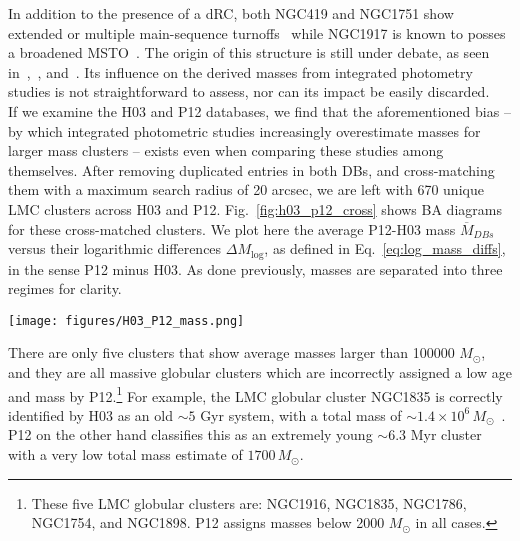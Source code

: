 \documentclass[draft]{aa}
\begin{document}
In addition to the presence of a dRC, both NGC419 and NGC1751 show
extended or multiple main-sequence turnoffs~\citep[MSTO; see:][]
{Glatt_2008,Milone_2009,Rubele_2010,Rubele_2011,Girardi_2011}
while NGC1917 is known to posses a broadened MSTO~\citep{Milone_2009}.
The origin of this structure is still under debate, as seen in~\cite
{Piatti_Bastian_2016},~\cite{Milone_2016}, and~\cite{Li_2016}.
Its influence on the derived masses from integrated photometry studies is not
straightforward to assess, nor can its impact be easily discarded.\\

If we examine the H03 and P12 databases, we find that the aforementioned bias
-- by which integrated photometric studies increasingly overestimate masses for
larger mass clusters -- exists even when comparing these studies among
themselves.
%
After removing duplicated entries in both DBs, and cross-matching them with
a maximum search radius of 20 arcsec, we are left with 670 unique LMC clusters
across H03 and P12.
Fig.~\ref{fig:h03_p12_cross} shows BA diagrams for these cross-matched clusters.
We plot here the average P12-H03 mass $\overline{M}_{DBs}$
versus their logarithmic differences $\Delta M_{\log}$, as defined in
Eq.~\ref{eq:log_mass_diffs}, in the sense P12 minus H03. As done previously,
masses are separated into three regimes for clarity.
%
\begin{figure*}
\texttt{[image: figures/H03\_P12\_mass.png]}
\caption{\emph{Left}: BA plot for the logarithmic mass differences between P12
and H03 masses, for average mass values below 1000 $M_{\odot}$. Clusters are
colored according to the difference in their assigned logarithmic ages by each
DB -- i.e.: $\Delta \log(age/yr)$ -- in the sense P12 minus H03; see colorbar in
the right plot. The mean and standard deviation $\Delta M_{\log}$ are shown as a
dashed black line and a gray region, respectively.
\emph{Center}: idem, for average DB masses $1000<\overline{M}_{DB}<10000\,(M_
{\odot})$.
\emph{Right}: idem, for average DB masses $\overline{M}_{DB}>10000\,(M_
{\odot})$.}
\label{fig:h03_p12_cross}
\end{figure*}
%
There are only five clusters that show average masses larger than 100000
$M_{\odot}$, and they are all massive globular clusters which are incorrectly
assigned a low age and mass by P12.\footnote{These five LMC globular clusters
are: NGC1916, NGC1835, NGC1786, NGC1754, and NGC1898. P12 assigns masses
below 2000 $M_{\odot}$ in all cases.}
For example, the LMC globular cluster NGC1835 is correctly identified by H03 as
an old ${\sim}5$ Gyr system, with a total mass of
$\sim1.4{\times}10^6\,M_{\odot}$~\citep[a reasonable value, although a bit
overestimated, according to][]{Dubath_1990}. P12 on the other hand classifies
this as an extremely young ${\sim}6.3$ Myr cluster with a very low total mass
estimate of $1700\,M_{\odot}$.
\end{document}
